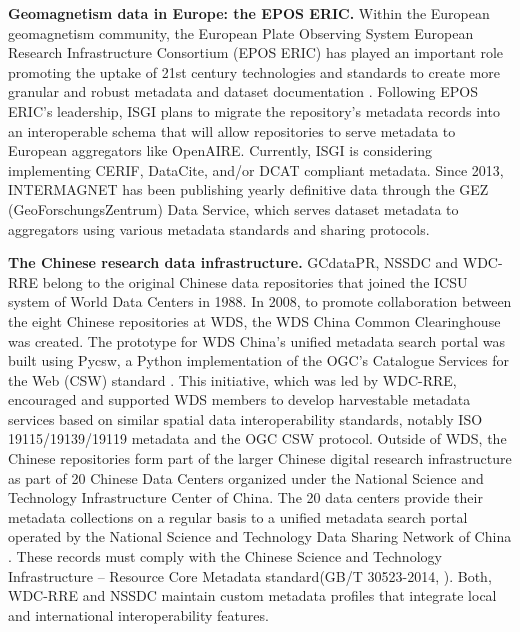 \documentclass{interact}
\begin{document}
\medskip
\noindent \textbf{Geomagnetism data in Europe: the EPOS ERIC.}
Within the European geomagnetism community, the European Plate Observing System European Research Infrastructure Consortium (EPOS ERIC) has played an important role promoting the uptake of 21st century technologies and standards to create more granular and robust metadata and dataset documentation \parencite{chambodut_geomagnetic_2018, flower_epos_2019}. Following EPOS ERIC's leadership, ISGI plans to migrate the repository's metadata records into an interoperable schema that will allow repositories to serve metadata to European aggregators like OpenAIRE. Currently, ISGI is considering implementing CERIF, DataCite, and/or DCAT compliant metadata. Since 2013, INTERMAGNET has been publishing yearly definitive data through the GEZ (GeoForschungsZentrum) Data Service, which serves dataset metadata to aggregators using various metadata standards and sharing protocols.

\medskip
\noindent \textbf{The Chinese research data infrastructure.}
GCdataPR, NSSDC and WDC-RRE belong to the original Chinese data repositories that joined the ICSU system of World Data Centers in 1988. In 2008, to promote collaboration between the eight Chinese repositories at WDS, the WDS China Common Clearinghouse\parencite{wds-china_introduction_2017} was created. The prototype for WDS China's unified metadata search portal was built using Pycsw, a Python implementation of the OGC's Catalogue Services for the Web (CSW) standard \parencite{wang_progress_2020}. This initiative, which was led by WDC-RRE, encouraged and supported WDS members to develop harvestable metadata services based on similar spatial data interoperability standards, notably ISO 19115/19139/19119 metadata and the OGC CSW protocol.
Outside of WDS, the Chinese repositories form part of the larger Chinese digital research infrastructure as part of 20 Chinese Data Centers organized under the National Science and Technology Infrastructure Center of China. The 20 data centers provide their metadata collections on a regular basis to a unified metadata search portal operated by the National Science and Technology Data Sharing Network of China \parencite{nsti_china_2021}. These records must comply with the Chinese Science and Technology Infrastructure – Resource Core Metadata standard(GB/T 30523-2014, \cite{china_national_institute_of_standardization_gbt_2014}). Both, WDC-RRE and NSSDC maintain custom metadata profiles that integrate local and international interoperability features.
\end{document}

